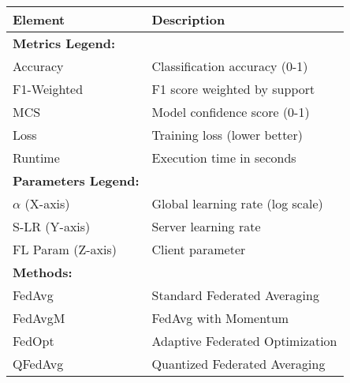 \documentclass[border=5pt]{standalone}
\begin{document}
    \begin{tabularx}{\textwidth}{lX}
    \toprule
    \textbf{Element} & \textbf{Description} \\
    \midrule
    \textbf{Metrics Legend:} & \\
    \quad Accuracy & Classification accuracy (0-1) \\
    \quad F1-Weighted & F1 score weighted by support \\
    \quad MCS & Model confidence score (0-1) \\
    \quad Loss & Training loss (lower better) \\
    \quad Runtime & Execution time in seconds \\
    \midrule
    \textbf{Parameters Legend:} & \\
    \quad $\alpha$ (X-axis) & Global learning rate (log scale) \\
    \quad S-LR (Y-axis) & Server learning rate \\
    \quad FL Param (Z-axis) & Client parameter \\
    \midrule
    \textbf{Methods:} & \\
    \quad FedAvg & Standard Federated Averaging \\
    \quad FedAvgM & FedAvg with Momentum \\
    \quad FedOpt & Adaptive Federated Optimization \\
    \quad QFedAvg & Quantized Federated Averaging \\
    \bottomrule
    \end{tabularx}
    
\end{document}

